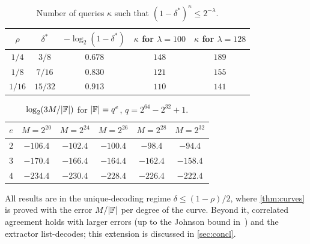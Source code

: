 \begin{table}[ht]
\centering
\begin{tabular}{ccccc}
\toprule
$\rho$ & $\delta^*$ & $-\log_2(1-\delta^*)$ & $\kappa$ for $\lambda = 100$ & $\kappa$ for $\lambda = 128$ \\
\midrule
$1/4$ & $3/8$ & $0.678$ & $148$ & $189$ \\
$1/8$ & $7/16$ & $0.830$ & $121$ & $155$ \\
$1/16$ & $15/32$ & $0.913$ & $110$ & $141$ \\
\bottomrule
\end{tabular}
\caption{Number of queries $\kappa$ such that $(1-\delta^*)^\kappa \le 2^{-\lambda}$.}
\label{tab:kappa}
\end{table}

\begin{table}[ht]
\centering
\begin{tabular}{cccccc}
\toprule
$e$ & $M = 2^{20}$ & $M = 2^{24}$ & $M = 2^{26}$ & $M = 2^{28}$ & $M = 2^{32}$ \\
\midrule
$2$ & $-106.4$ & $-102.4$ & $-100.4$ & $-98.4$ & $-94.4$ \\
$3$ & $-170.4$ & $-166.4$ & $-164.4$ & $-162.4$ & $-158.4$ \\
$4$ & $-234.4$ & $-230.4$ & $-228.4$ & $-226.4$ & $-222.4$ \\
\bottomrule
\end{tabular}
\caption{$\log_2(3M/|\mathbb{F}|)$ for $|\mathbb{F}| = q^e$, $q = 2^{64}-2^{32}+1$.}
\label{tab:field}
\end{table}

\begin{remark}\label{rem:unique-only}
All results are in the unique-decoding regime $\delta \le (1-\rho)/2$, where \cref{thm:curves} is proved with the error $M/|\mathbb{F}|$ per degree of the curve.
Beyond it, correlated agreement holds with larger errors (up to the Johnson bound in~\cite{BCIKS23}) and the extractor list-decodes; this extension is discussed in \cref{sec:concl}.
\end{remark}
